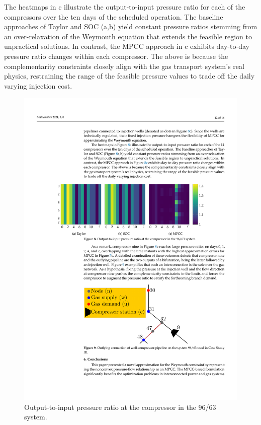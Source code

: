 The heatmaps in c illustrate the output-to-input pressure ratio for each of the  compressors over the ten days of the scheduled operation. The baseline approaches of Taylor and SOC (a,b) yield constant pressure ratios stemming from an over-relaxation of the Weymouth equation that extends the feasible region to unpractical solutions. In contrast, the MPCC approach in c exhibits day-to-day pressure ratio changes within each compressor. The above is because the complementarity constraints closely align with the gas transport system's real physics, restraining the range of the feasible pressure values to trade off the daily varying injection cost.

\vspace{-4pt}
\begin{figure}[H]

\centering %
 \includegraphics[scale=1.03]{figures/Chapter_MPCC/g007.pdf}
\caption{Output-to-input pressure ratio at the compressor in the  96/63 system. }
\label{fig:red_test_heatmaps}
\end{figure}


